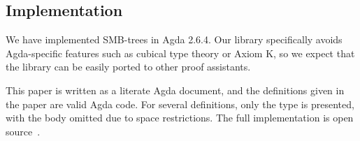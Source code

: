 \subsection{Implementation}

We have implemented SMB-trees in Agda 2.6.4.
Our library specifically avoids Agda-specific features
such as cubical type theory or Axiom K, so we expect
that the library can be easily ported to other proof assistants.

This paper is written as a literate Agda document, and the definitions
given in the paper are valid Agda code.
For several definitions, only the type is presented, with the body omitted due to
space restrictions. The full implementation is open source~\citep{smbtreeZenodo}.
